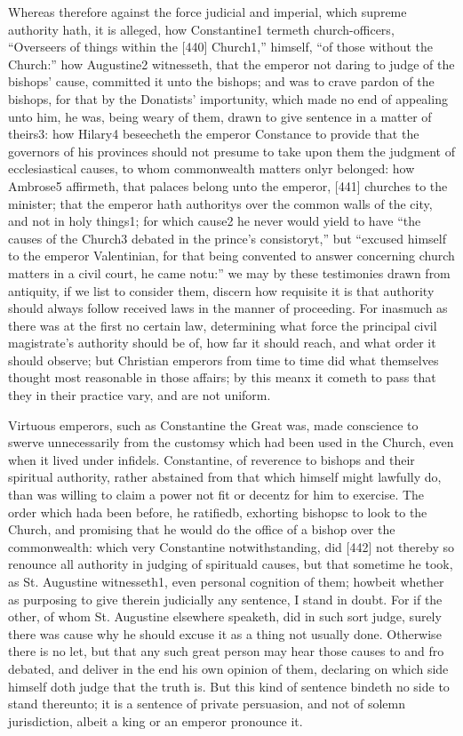 Whereas therefore against the force judicial and imperial, which supreme authority hath, it is alleged, how Constantine1 termeth church-officers, “Overseers of things within the [440] Church1,” himself, “of those without the Church:” how Augustine2 witnesseth, that the emperor not daring to judge of the bishops’ cause, committed it unto the bishops; and was to crave pardon of the bishops, for that by the Donatists’ importunity, which made no end of appealing unto him, he was, being weary of them, drawn to give sentence in a matter of theirs3: how Hilary4 beseecheth the emperor Constance to provide that the governors of his provinces should not presume to take upon them the judgment of ecclesiastical causes, to whom commonwealth matters onlyr belonged: how Ambrose5 affirmeth, that palaces belong unto the emperor, [441] churches to the minister; that the emperor hath authoritys over the common walls of the city, and not in holy things1; for which cause2 he never would yield to have “the causes of the Church3 debated in the prince’s consistoryt,” but “excused himself to the emperor Valentinian, for that being convented to answer concerning church matters in a civil court, he came notu:” we may by these testimonies drawn from antiquity, if we list to consider them, discern how requisite it is that authority should always follow received laws in the manner of proceeding. For inasmuch as there was at the first no certain law, determining what force the principal civil magistrate’s authority should be of, how far it should reach, and what order it should observe; but Christian emperors from time to time did what themselves thought most reasonable in those affairs; by this meanx it cometh to pass that they in their practice vary, and are not uniform.

Virtuous emperors, such as Constantine the Great was, made conscience to swerve unnecessarily from the customsy which had been used in the Church, even when it lived under infidels. Constantine, of reverence to bishops and their spiritual authority, rather abstained from that which himself might lawfully do, than was willing to claim a power not fit or decentz for him to exercise. The order which hada been before, he ratifiedb, exhorting bishopsc to look to the Church, and promising that he would do the office of a bishop over the commonwealth: which very Constantine notwithstanding, did [442] not thereby so renounce all authority in judging of spirituald causes, but that sometime he took, as St. Augustine witnesseth1, even personal cognition of them; howbeit whether as purposing to give therein judicially any sentence, I stand in doubt. For if the other, of whom St. Augustine elsewhere speaketh, did in such sort judge, surely there was cause why he should excuse it as a thing not usually done. Otherwise there is no let, but that any such great person may hear those causes to and fro debated, and deliver in the end his own opinion of them, declaring on which side himself doth judge that the truth is. But this kind of sentence bindeth no side to stand thereunto; it is a sentence of private persuasion, and not of solemn jurisdiction, albeit a king or an emperor pronounce it.

